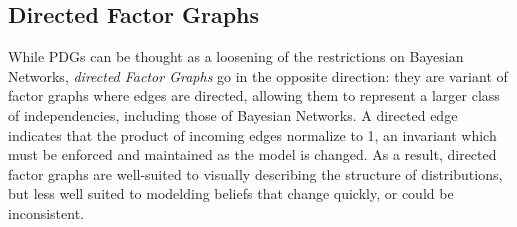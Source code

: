 \documentclass{article}
\begin{document}
	\begin{inactive}
	
		\subsection{Directed Factor Graphs}
	While PDGs can be thought as a loosening of the restrictions on
		Bayesian Networks, 
	\emph{directed Factor Graphs} \cite{frey2012extending} go in the
		opposite direction: they  
	are variant of factor graphs where edges are directed,
		allowing them to represent a larger class of independencies,
	including those of Bayesian Networks. A directed edge
		indicates that the product of incoming edges normalize to 1,
		an invariant which must be enforced and maintained as the
		model is changed. As a result, directed factor graphs are
		well-suited to visually describing the structure of
		distributions, but less well suited to modelding beliefs that
		change quickly, or could be inconsistent. 
	\end{inactive}
	
\end{document}
